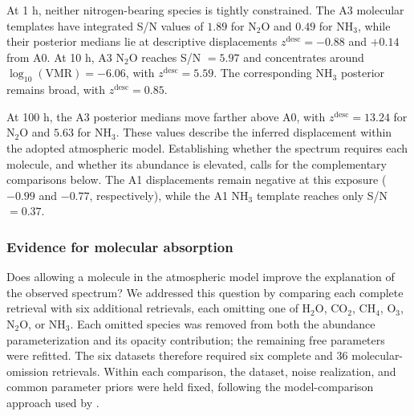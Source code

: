 At 1 h, neither nitrogen-bearing species is tightly constrained. The A3 molecular templates have integrated S/N values of $1.89$ for $\mathrm{N_2O}$ and $0.49$ for $\mathrm{NH_3}$, while their posterior medians lie at descriptive displacements $z^{\mathrm{desc}}=-0.88$ and $+0.14$ from A0. At 10 h, A3 $\mathrm{N_2O}$ reaches S/N $=5.97$ and concentrates around $\log_{10}(\mathrm{VMR})=-6.06$, with $z^{\mathrm{desc}}=5.59$. The corresponding $\mathrm{NH_3}$ posterior remains broad, with $z^{\mathrm{desc}}=0.85$.

At 100 h, the A3 posterior medians move farther above A0, with $z^{\mathrm{desc}}=13.24$ for $\mathrm{N_2O}$ and $5.63$ for $\mathrm{NH_3}$. These values describe the inferred displacement within the adopted atmospheric model. Establishing whether the spectrum requires each molecule, and whether its abundance is elevated, calls for the complementary comparisons below. The A1 displacements remain negative at this exposure ($-0.99$ and $-0.77$, respectively), while the A1 $\mathrm{NH_3}$ template reaches only S/N $=0.37$.

\subsubsection{Evidence for molecular absorption}
\label{sec:life_molecular_evidence}

Does allowing a molecule in the atmospheric model improve the explanation of the observed spectrum? We addressed this question by comparing each complete retrieval with six additional retrievals, each omitting one of $\mathrm{H_2O}$, $\mathrm{CO_2}$, $\mathrm{CH_4}$, $\mathrm{O_3}$, $\mathrm{N_2O}$, or $\mathrm{NH_3}$. Each omitted species was removed from both the abundance parameterization and its opacity contribution; the remaining free parameters were refitted. The six datasets therefore required six complete and 36 molecular-omission retrievals. Within each comparison, the dataset, noise realization, and common parameter priors were held fixed, following the model-comparison approach used by \citet{linDifferentiatingModernPrebiotic2021}.


